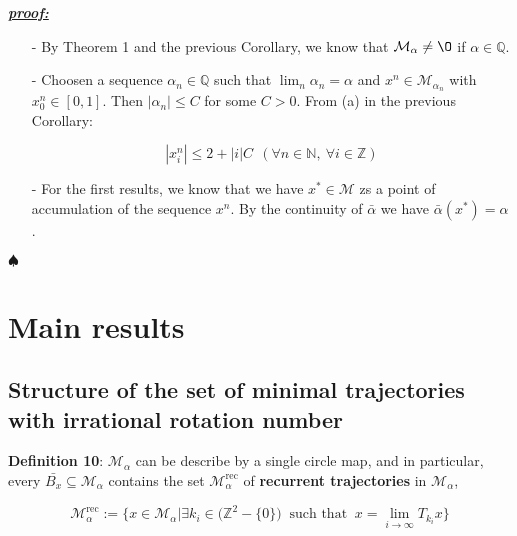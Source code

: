 \documentclass{article}
\begin{document}
\color{blue}
	\noindent \underline{\textbf{\textit{proof:}}} 		
		\begin{itemize}
			\item[-] By Theorem 1 and the previous Corollary, we know that $\mathcal{M}_{\alpha} \neq \O$ if $\alpha \in \mathbb{Q}$.
			\item[-] Choosen a sequence $\alpha_n \in \mathbb{Q}$ such that $\lim_{n} \alpha_n = \alpha$ and $x^{n} \in \mathcal{M}_{\alpha_n}$ with $x_{0}^{n} \in [0, 1]$. Then $| \alpha_n | \leq C$ for some $C > 0$. From (a) in the previous Corollary:
			
				$$
					| x_{i}^{n} | \leq 2 + |i| C \ \ (\forall n \in \mathbb{N}, \ \forall i \in \mathbb{Z})
				$$
				
			\item[-] For the first results, we know that we have $x^{*} \in \mathcal{M}$ zs a point of accumulation of the sequence $x^n$. By the continuity of $\bar{\alpha}$ we have $\bar{\alpha} (x^{*}) = \alpha$.
		\end{itemize}
		
	
	\noindent $\spadesuit$
\color{black}





		
\section{Main results}
		
\subsection{Structure of the set of minimal trajectories with irrational rotation number}

\noindent \textbf{Definition 10}: $\mathcal{M}_{\alpha}$ can be describe by a single circle map, and in particular, every $\bar{B_{x}} \subseteq \mathcal{M}_{\alpha}$ contains the set $\mathcal{M}_{\alpha}^{\text{rec}}$ of \textbf{recurrent trajectories} in $\mathcal{M}_{\alpha}$, 

	$$
		\mathcal{M}_{\alpha}^{\text{rec}} := \{ x \in \mathcal{M}_{\alpha} | \exists k_i \in \big( \mathbb{Z}^{2} - \{ 0 \}       \big) \ \text{ such that } \ x = \lim_{i \rightarrow \infty } T_{k_i} x \}
	$$
	
\end{document}

